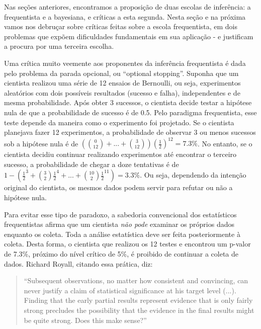 Nas seções anteriores, encontramos a proposição de duas escolas de inferência: a frequentista e a bayesiana, e críticas
a esta segunda. Nesta seção e na próxima vamos nos debruçar sobre críticas feitas sobre a escola frequentista, em dois
problemas que expõem dificuldades fundamentais em sua aplicação - e justificam a procura por uma terceira escolha.

Uma crítica muito veemente aos proponentes da inferência frequentista é dada pelo problema da parada opcional, ou 
``optional stopping''. Suponha que um cientista realizou uma série de 12 ensaios de Bernoulli, ou seja, experimentos aleatórios
com dois possíveis resultados (sucesso e falha), independentes e de mesma probabilidade. Após obter 3 sucessos, o cientista
decide testar a hipótese nula de que a probabilidade de sucesso é de 0.5. Pelo paradigma frequentista, esse teste depende
da maneira como o experimento foi projetado. Se o cientista planejava fazer 12 experimentos, a probabilidade de observar 3
ou menos sucessos sob a hipótese nula é de $ \left( {0 \choose 12} + ... + {3 \choose 12}\right) (\frac{1}{2})^{12} = 7.3\%$. 
No entanto, se o cientista decidiu continuar realizando experimentos até
encontrar o terceiro sucesso, a probabilidade de chegar a doze tentativas é de 
$1 - \left( \frac{1}{2}^3 + {3 \choose 2} \frac{1}{2}^4 + ... + {10 \choose 2} \frac{1}{2}^{11}\right) = 3.3\%$. Ou seja,
dependendo da intenção original do cientista, os mesmos dados podem servir para refutar ou não a hipótese nula.

Para evitar esse tipo de  paradoxo, a sabedoria convencional dos estatísticos frequentistas afirma que um cientista {\em não pode}
examinar os próprios dados enquanto os coleta. Toda a análise estatística deve ser feita posteriormente à coleta. 
Desta forma, o cientista que realizou os 12 testes e encontrou um p-valor de 7.3\%, próximo do nível crítico de 5\%, é
proibido de continuar a coleta de dados. Richard Royall, citando essa prática, diz:

\begin{quote}
``Subsequent observations, no matter how consistent and convincing, can never justify a claim of statistical significance
at his target level (...). Finding that the early partial results represent evidence that is only fairly strong precludes
the possibility that the evidence in the final results might be quite strong. Does this make sense?'' \citep{Royall97}
\end{quote}

